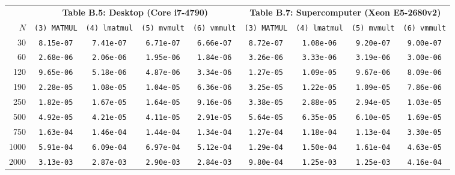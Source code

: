 \begin{table}[htbp]
\centering
\scriptsize
\setlength{\tabcolsep}{4pt}
\begin{tabular}{r c c c c @{\hspace{1.2em}} c c c c}
\toprule
 & \multicolumn{4}{c}{\textbf{Table B.5: Desktop (Core i7-4790)}} & \multicolumn{4}{c}{\textbf{Table B.7: Supercomputer (Xeon E5-2680v2)}} \\
\cmidrule(lr){2-5} \cmidrule(lr){6-9}
$N$ & \texttt{(3) MATMUL} & \texttt{(4) lmatmul} & \texttt{(5) mvmult} & \texttt{(6) vmmult} & \texttt{(3) MATMUL} & \texttt{(4) lmatmul} & \texttt{(5) mvmult} & \texttt{(6) vmmult} \\
\midrule
30    & \texttt{8.15e-07} & \texttt{7.41e-07} & \texttt{6.71e-07} & \texttt{6.66e-07} & \texttt{8.72e-07} & \texttt{1.08e-06} & \texttt{9.20e-07} & \texttt{9.00e-07} \\
60    & \texttt{2.68e-06} & \texttt{2.06e-06} & \texttt{1.95e-06} & \texttt{1.84e-06} & \texttt{3.26e-06} & \texttt{3.33e-06} & \texttt{3.19e-06} & \texttt{3.00e-06} \\
120   & \texttt{9.65e-06} & \texttt{5.18e-06} & \texttt{4.87e-06} & \texttt{3.34e-06} & \texttt{1.27e-05} & \texttt{1.09e-05} & \texttt{9.67e-06} & \texttt{8.09e-06} \\
190   & \texttt{2.28e-05} & \texttt{1.08e-05} & \texttt{1.04e-05} & \texttt{6.36e-06} & \texttt{3.25e-05} & \texttt{1.22e-05} & \texttt{1.09e-05} & \texttt{7.86e-06} \\
250   & \texttt{1.82e-05} & \texttt{1.67e-05} & \texttt{1.64e-05} & \texttt{9.16e-06} & \texttt{3.38e-05} & \texttt{2.88e-05} & \texttt{2.94e-05} & \texttt{1.03e-05} \\
500   & \texttt{4.92e-05} & \texttt{4.21e-05} & \texttt{4.11e-05} & \texttt{2.91e-05} & \texttt{5.64e-05} & \texttt{6.35e-05} & \texttt{6.10e-05} & \texttt{1.69e-05} \\
750   & \texttt{1.63e-04} & \texttt{1.46e-04} & \texttt{1.44e-04} & \texttt{1.34e-04} & \texttt{1.27e-04} & \texttt{1.18e-04} & \texttt{1.13e-04} & \texttt{3.30e-05} \\
1000  & \texttt{5.91e-04} & \texttt{6.09e-04} & \texttt{6.97e-04} & \texttt{5.12e-04} & \texttt{1.29e-04} & \texttt{1.50e-04} & \texttt{1.61e-04} & \texttt{4.63e-05} \\
2000  & \texttt{3.13e-03} & \texttt{2.87e-03} & \texttt{2.90e-03} & \texttt{2.84e-03} & \texttt{9.80e-04} & \texttt{1.25e-03} & \texttt{1.25e-03} & \texttt{4.16e-04} \\

\end{tabular}
\end{table}
